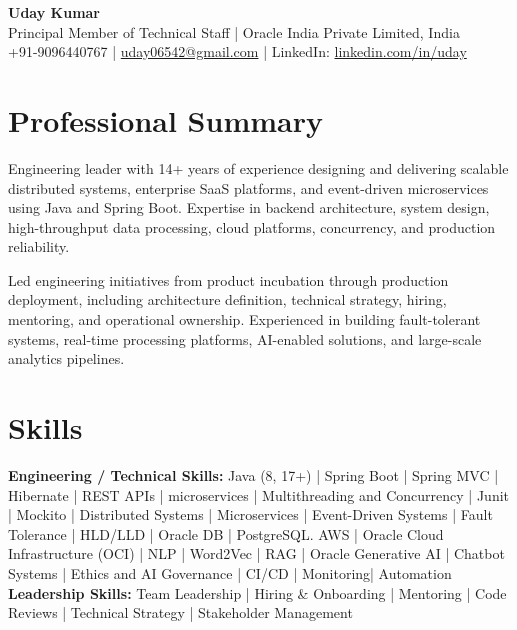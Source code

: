 \documentclass[11pt,a4paper]{article}
\begin{document}
\begin{center}
    {\LARGE \textbf{Uday Kumar}} \\[4pt]
    
    Principal Member of Technical Staff \; | \; Oracle India Private Limited, India \\[4pt]
    
    +91-9096440767 \; | \;
    \href{mailto:uday06542@gmail.com}{uday06542@gmail.com}
    \; | \;
    LinkedIn:
    \href{https://www.linkedin.com/in/uday/}{linkedin.com/in/uday}
\end{center}

\section*{Professional Summary}

Engineering leader with 14+ years of experience designing and delivering scalable distributed systems, enterprise SaaS platforms, and event-driven microservices using Java and Spring Boot. Expertise in backend architecture, system design, high-throughput data processing, cloud platforms, concurrency, and production reliability.

Led engineering initiatives from product incubation through production deployment, including architecture definition, technical strategy, hiring, mentoring, and operational ownership. Experienced in building fault-tolerant systems, real-time processing platforms, AI-enabled solutions, and large-scale analytics pipelines.

\section*{Skills}

\textbf{Engineering / Technical Skills:} Java (8, 17+) | Spring Boot | Spring MVC | Hibernate | REST APIs | microservices | Multithreading and Concurrency | Junit | 
Mockito | Distributed Systems | Microservices | Event-Driven Systems | Fault Tolerance | HLD/LLD | Oracle DB | PostgreSQL. AWS | Oracle Cloud Infrastructure (OCI) | 
NLP | Word2Vec | RAG | Oracle Generative AI | Chatbot Systems | Ethics and AI Governance | CI/CD | Monitoring| Automation \\
\textbf{Leadership Skills:} Team Leadership | Hiring \& Onboarding | Mentoring | Code Reviews | Technical Strategy | Stakeholder Management \\
\end{document}
